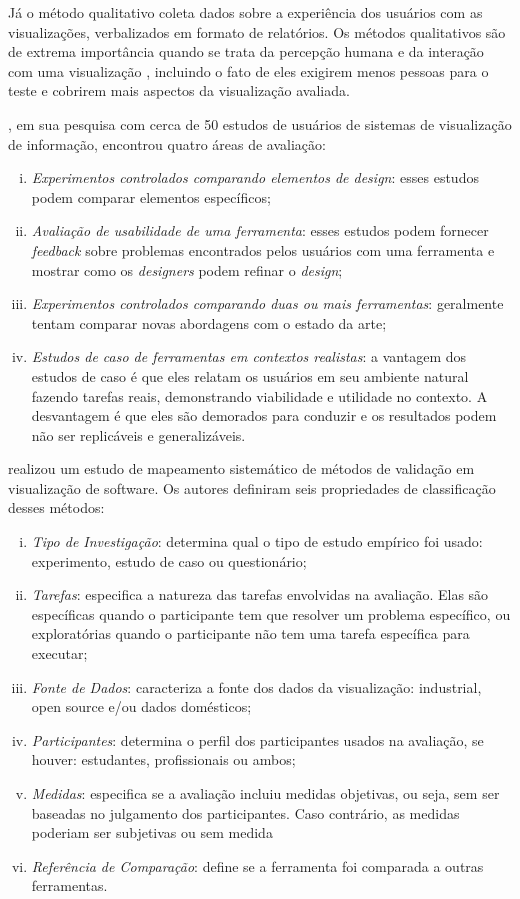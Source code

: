 Já o método qualitativo coleta dados sobre a experiência dos usuários com as visualizações, verbalizados em formato de relatórios. Os métodos qualitativos são de extrema importância quando se trata da percepção humana e da interação com uma visualização \cite{McConathy1993}, incluindo o fato de eles exigirem menos pessoas para o teste e cobrirem mais aspectos da visualização avaliada.

\citeauthor{komlodi2004information}, em sua pesquisa com cerca de 50 estudos de usuários de sistemas de visualização de informação, encontrou quatro áreas de avaliação:
\begin{enumerate}[(i)]
	\item \textit{Experimentos controlados comparando elementos de design}: esses estudos podem comparar elementos específicos;
	\item \textit{Avaliação de usabilidade de uma ferramenta}: esses estudos podem fornecer \textit{feedback} sobre problemas encontrados pelos usuários com uma ferramenta e mostrar como os \textit{designers} podem refinar o \textit{design};
	\item \textit{Experimentos controlados comparando duas ou mais ferramentas}: geralmente tentam comparar novas abordagens com o estado da arte;
	\item \textit{Estudos de caso de ferramentas em contextos realistas}: a vantagem dos estudos de caso é que eles relatam os usuários em seu ambiente natural fazendo tarefas reais, demonstrando viabilidade e utilidade no contexto. A desvantagem é que eles são demorados para conduzir e os resultados podem não ser replicáveis e generalizáveis.
\end{enumerate}

\citeauthor{Seriai2014} realizou um estudo de mapeamento sistemático de métodos de validação em visualização de software. Os autores definiram seis propriedades de classificação desses métodos:
\begin{enumerate}[(i)]
	\item \textit{Tipo de Investigação}: determina qual o tipo de estudo empírico foi usado: experimento, estudo de caso ou questionário;
	\item \textit{Tarefas}: especifica a natureza das tarefas envolvidas na avaliação. Elas são específicas quando o participante tem que resolver um problema específico, ou exploratórias quando o participante não tem uma tarefa específica para executar;
	\item \textit{Fonte de Dados}: caracteriza a fonte dos dados da visualização: industrial, open source e/ou dados domésticos;
	\item \textit{Participantes}: determina o perfil dos participantes usados na avaliação, se houver: estudantes, profissionais ou ambos;
	\item \textit{Medidas}: especifica se a avaliação incluiu medidas objetivas, ou seja, sem ser baseadas no julgamento dos participantes. Caso contrário, as medidas poderiam ser subjetivas ou sem medida
	\item \textit{Referência de Comparação}: define se a ferramenta foi comparada a outras ferramentas.
\end{enumerate}

